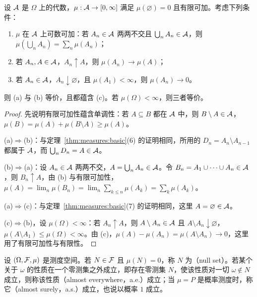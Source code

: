 \begin{proposition}[可数可加性与连续性]\label{prop:measures:additivity-continuity}
设 $\mathcal{A}$ 是 $\Omega$ 上的代数，$\mu:\mathcal{A}\to[0,\infty]$ 满足 $\mu(\varnothing)=0$ 且有限可加。考虑下列条件：
\begin{enumerate}
\item[(a)] $\mu$ 在 $\mathcal{A}$ 上可数可加：若 $A_n\in\mathcal{A}$ 两两不交且 $\bigcup_nA_n\in\mathcal{A}$，则 $\mu(\bigcup_nA_n)=\sum_n\mu(A_n)$；
\item[(b)] 若 $A_n,A\in\mathcal{A}$，$A_n\uparrow A$，则 $\mu(A_n)\to\mu(A)$；
\item[(c)] 若 $A_n\in\mathcal{A}$，$A_n\downarrow\varnothing$，且 $\mu(A_1)<\infty$，则 $\mu(A_n)\to0$。
\end{enumerate}
则 (a) 与 (b) 等价，且都蕴含 (c)。若 $\mu(\Omega)<\infty$，则三者等价。
\end{proposition}
\begin{proof}
先说明有限可加性蕴含单调性：若 $A\subseteq B$ 都在 $\mathcal{A}$ 中，则 $B\setminus A\in\mathcal{A}$，$\mu(B)=\mu(A)+\mu(B\setminus A)\geqslant\mu(A)$。

(a)$\Rightarrow$(b)：与定理~\ref{thm:measures:basic}(6) 的证明相同，所用的 $D_n=A_n\setminus A_{n-1}$ 都属于 $\mathcal{A}$，而 $\bigcup_nD_n=A\in\mathcal{A}$。

(b)$\Rightarrow$(a)：设 $A_n\in\mathcal{A}$ 两两不交，$A=\bigcup_nA_n\in\mathcal{A}$。令 $B_n=A_1\cup\cdots\cup A_n\in\mathcal{A}$，则 $B_n\uparrow A$，由 (b) 与有限可加性，$\mu(A)=\lim_n\mu(B_n)=\lim_n\sum_{k\leqslant n}\mu(A_k)=\sum_k\mu(A_k)$。

(a)$\Rightarrow$(c)：与定理~\ref{thm:measures:basic}(7) 的证明相同，这里 $A=\varnothing\in\mathcal{A}$。

(c)$\Rightarrow$(b)，设 $\mu(\Omega)<\infty$：若 $A_n\uparrow A$，则 $A\setminus A_n\in\mathcal{A}$ 且 $A\setminus A_n\downarrow\varnothing$，$\mu(A\setminus A_1)\leqslant\mu(\Omega)<\infty$。由 (c)，$\mu(A)-\mu(A_n)=\mu(A\setminus A_n)\to0$，这里用了有限可加性与有限性。
\end{proof}

\begin{definition}[零测集与几乎处处]\label{def:measures:null}
设 $(\Omega,\mathcal{F},\mu)$ 是测度空间。若 $N\in\mathcal{F}$ 且 $\mu(N)=0$，称 $N$ 为（null set）。若某个关于 $\omega$ 的性质在一个零测集之外成立，即存在零测集 $N$，使该性质对一切 $\omega\notin N$ 成立，则称该性质（almost everywhere，a.e.）成立；当 $\mu=P$ 是概率测度时，称它（almost surely，a.s.）成立，也说以概率 $1$ 成立。
\end{definition}

